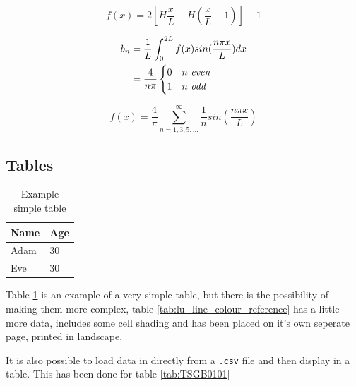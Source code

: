 \begin{equation}
    \label{eq:1}
    f(x) = 2[H \frac{x}{L} - H(\frac{x}{L} - 1)] - 1
\end{equation}

\begin{equation}
    \label{eq:2}
    \begin{split}
        b_n & = \frac{1}{L} \int_0^{2L} f(x) sin(\frac{n \pi x}{L}) dx \\
            & = \frac{4}{n \pi} 
        \begin{cases}
            0 &\text{$n$ \textit{even}} \\
            1 &\text{$n$ \textit{odd}}
        \end{cases}
    \end{split}
\end{equation}

\begin{equation}
    \label{eq:3}
    f(x) = \frac{4}{\pi} \sum_{n=1,3,5,\ldots}^\infty \frac{1}{n} sin(\frac{n \pi x}{L})
\end{equation}

\subsection{Tables}

\begin{table}[h]
\centering
\caption{Example simple table}
\label{tab:simple-table}
\begin{tabular}{@{}ll@{}}
\toprule
Name & Age \\ \midrule
Adam & 30 \\
Eve & 30 \\ \bottomrule
\end{tabular}
\end{table}

Table \ref{tab:simple-table} is an example of a very simple table, but there is the possibility of making them more complex, table \ref{tab:lu_line_colour_reference} has a little more data, includes some cell shading and has been placed on it's own seperate page, printed in landscape.



It is also possible to load data in directly from a \verb|.csv| file and then display in a table. This has been done for table \ref{tab:TSGB0101}

